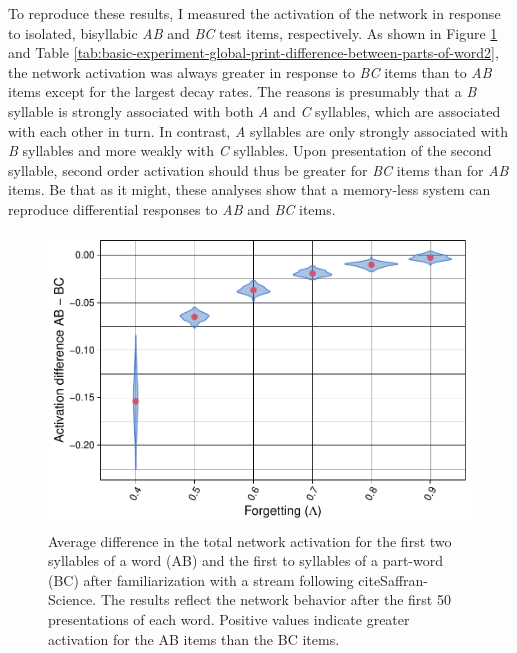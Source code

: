 \documentclass[
]{article}
\begin{document}
To reproduce these results, I measured the activation of the network in
response to isolated, bisyllabic \emph{AB} and \emph{BC} test items,
respectively. As shown in Figure
\ref{fig:basic-experiment-global-print-act-after-2syll-plot} and Table
\ref{tab:basic-experiment-global-print-difference-between-parts-of-word2},
the network activation was always greater in response to \emph{BC} items
than to \emph{AB} items except for the largest decay rates. The reasons
is presumably that a \emph{B} syllable is strongly associated with both
\emph{A} and \emph{C} syllables, which are associated with each other in
turn. In contrast, \emph{A} syllables are only strongly associated with
\emph{B} syllables and more weakly with \emph{C} syllables. Upon
presentation of the second syllable, second order activation should thus
be greater for \emph{BC} items than for \emph{AB} items. Be that as it
might, these analyses show that a memory-less system can reproduce
differential responses to \emph{AB} and \emph{BC} items.

\begin{figure}
\includegraphics[width=1\linewidth]{tp_model_entrainment_files/figure-latex/basic-experiment-global-print-act-after-2syll-plot-1} \caption{Average difference in the total network activation for the first two syllables of a word (AB) and the first to syllables of a part-word (BC) after familiarization with a stream following cite{Saffran-Science}. The results reflect the network behavior after the first 50 presentations of each word. Positive values indicate greater activation for the AB items than the BC items.}\label{fig:basic-experiment-global-print-act-after-2syll-plot}
\end{figure}
\end{document}
